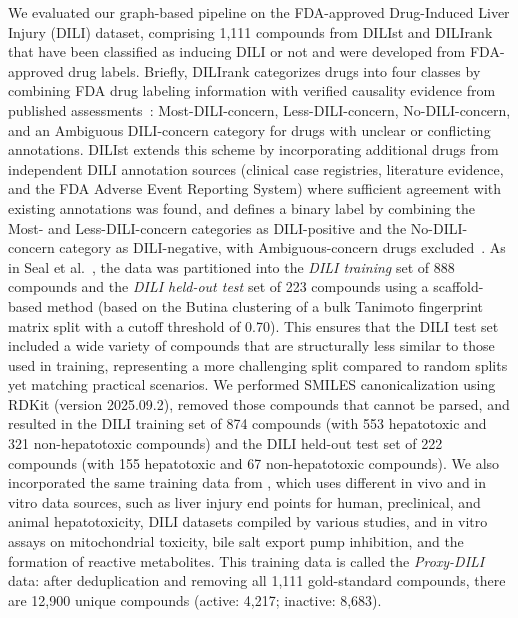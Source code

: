 \documentclass[letterpaper]{article}
\begin{document}
We evaluated our graph-based pipeline on the FDA-approved Drug-Induced Liver Injury (DILI) dataset, comprising 1,111 compounds from DILIst \cite{thakkar2020drug} and DILIrank \cite{chen2016dilirank} that have been classified as inducing DILI or not and were developed from FDA-approved drug labels. Briefly, DILIrank categorizes drugs into four classes by combining FDA drug labeling information with verified causality evidence from published assessments~\cite{chen2016dilirank}: Most-DILI-concern, Less-DILI-concern, No-DILI-concern, and an Ambiguous DILI-concern category for drugs with unclear or conflicting annotations. DILIst extends this scheme by incorporating additional drugs from independent DILI annotation sources (clinical case registries, literature evidence, and the FDA Adverse Event Reporting System) where sufficient agreement with existing annotations was found, and defines a binary label by combining the Most- and Less-DILI-concern categories as DILI-positive and the No-DILI-concern category as DILI-negative, with Ambiguous-concern drugs excluded~\cite{thakkar2020drug}. As in Seal et al.~\cite{seal2024improved}, the data was partitioned into the \emph{DILI training} set of 888 compounds and the \emph{DILI held-out test} set of 223 compounds using a scaffold-based method (based on the Butina clustering of a bulk Tanimoto fingerprint matrix split with a cutoff threshold of 0.70). This ensures that the DILI test set included a wide variety of compounds that are structurally less similar to those used in training, representing a more challenging split compared to random splits yet matching practical scenarios. We performed SMILES canonicalization using RDKit (version 2025.09.2), removed those compounds that cannot be parsed, and resulted in the DILI training set of 874 compounds (with 553 hepatotoxic and 321 non-hepatotoxic compounds) and the DILI held-out test set of 222 compounds (with 155 hepatotoxic and 67 non-hepatotoxic compounds). We also incorporated the same training data from \cite{seal2024improved}, which uses different in vivo and in vitro data sources, such as liver injury end points for human, preclinical, and animal hepatotoxicity, DILI datasets compiled by various studies, and in vitro assays on mitochondrial toxicity, bile salt export pump inhibition, and the formation of reactive metabolites. This training data is called the \emph{Proxy-DILI} data: after deduplication and removing all 1,111 gold-standard compounds, there are 12,900 unique compounds (active: 4,217; inactive: 8,683). 
\end{document}
